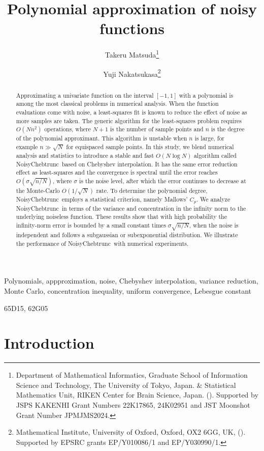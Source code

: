 \documentclass[final,onefignum,onetabnum]{siamart220329}
\title{
Polynomial approximation of noisy functions 
}
\author{Takeru Matsuda\thanks{Department of Mathematical Informatics, Graduate School of Information Science and Technology, The University of Tokyo, Japan. \& Statistical Mathematics Unit, RIKEN Center for Brain Science, Japan. (\email{matsuda@mist.i.u-tokyo.ac.jp}). Supported by JSPS KAKENHI Grant Numbers 22K17865, 24K02951 and JST Moonshot Grant Number JPMJMS2024.}
\and Yuji Nakatsukasa\thanks{Mathematical Institute, University of Oxford, Oxford, OX2 6GG, UK, (\email{nakatsukasa@maths.ox.ac.uk}). Supported by EPSRC grants EP/Y010086/1 and EP/Y030990/1.} }
\def\mainalg{NoisyChebtrunc}
\begin{document}
\maketitle

\begin{abstract}
	Approximating a univariate function on the interval $[-1,1]$ with a polynomial is among the most classical problems in numerical analysis. 
	When the function evaluations come with noise, a least-squares fit is known to reduce the effect of noise as more samples are taken. 
	The generic algorithm for the least-squares problem requires $O(Nn^2)$ operations, where $N+1$ is the number of sample points and $n$ is the degree of the polynomial approximant.
	This algorithm is unstable when $n$ is large, for example $n\gg \sqrt{N}$ for equispaced sample points. In this study, we blend numerical analysis and statistics to introduce a stable and fast $O(N\log N)$ algorithm called \mainalg\ based on Chebyshev interpolation.
	It has the same error reduction effect as least-squares and the convergence is spectral until the error reaches $O(\sigma \sqrt{{n}/{N}})$, where $\sigma$ is the noise level, after which the error continues to decrease at the Monte-Carlo $O(1/\sqrt{N})$ rate. 
	To determine the polynomial degree, \mainalg\ employs a statistical criterion, namely Mallows' $C_p$. 
	We analyze \mainalg\ in terms of the variance and concentration in the infinity norm to the underlying noiseless function. These results show that with high probability the infinity-norm error is bounded by a small constant times $\sigma \sqrt{{n}/{N}}$, when the noise {is} independent and follows a subgaussian or subexponential distribution.
	We illustrate the performance of \mainalg\ with numerical experiments.
\end{abstract}

\begin{keywords}
Polynomials, appproximation, noise, Chebyshev interpolation, variance reduction, Monte Carlo, concentration inequality, uniform convergence, Lebesgue constant 
  \end{keywords}

\begin{AMS}
	65D15, 62G05
\end{AMS}




\section{Introduction}
\end{document}
